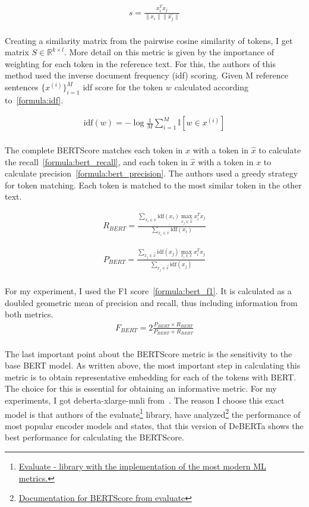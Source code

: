 \begin{align}\label{formula:cosine_sim}
    s = \frac{x_i^T x_j}{\|x_i\| \|\hat{x_j}\|}
\end{align}\\
Creating a similarity matrix from the pairwise cosine similarity of tokens, I get matrix $S \in \mathbb{R}^{k \times l}$. More detail on this metric is given by the importance of weighting for each token in the reference text. For this, the authors of this method used the inverse document frequency (idf) scoring. Given M reference sentences $\{ x^{(i)} \}_{i=1}^M$ idf score for the token $w$ calculated according to~\ref{formula:idf}. 

\begin{align}\label{formula:idf}
    \text{idf}(w) = -\log \frac{1}{M} \sum_{i=1}^{M} \mathbb{I}\left[ w \in x^{(i)} \right]
\end{align}\\
The complete BERTScore matches each token in $x$ with a token in $\hat{x}$ to calculate the recall~\ref{formula:bert_recall}, and each token in $\hat{x}$ with a token in $x$ to calculate precision~\ref{formula:bert_precision}. The authors used a greedy strategy for token matching. Each token is matched to the most similar token in the other text. 

\begin{align}\label{formula:bert_recall}
    R_{BERT} = \frac{\sum_{x_i \in x } \text{idf}(x_i) \max_{x_j \in \hat{x}} x_i^T x_j}{\sum_{x_i \in x} \text{idf}(x_i)}
\end{align}

\begin{align}\label{formula:bert_precision}
    P_{BERT} = \frac{\sum_{x_j \in \hat{x} } \text{idf}(x_j) \max_{x_i \in x} x_i^T x_j}{\sum_{x_j \in \hat{x}} \text{idf}(x_j)}
\end{align}\\
For my experiment, I used the F1 score~\ref{formula:bert_f1}. It is calculated as a doubled geometric mean of precision and recall, thus including information from both metrics. 
\begin{align}\label{formula:bert_f1}
    F_{BERT} = 2\frac{P_{BERT} \times R_{BERT}}{P_{BERT} + R_{BERT}}
\end{align}\\
The last important point about the BERTScore metric is the sensitivity to the base BERT model. As written above, the most important step in calculating this metric is to obtain representative embedding for each of the tokens with BERT\@. The choice for this is essential for obtaining an informative metric. For my experiments, I got deberta-xlarge-mnli from~\cite{he2021deberta}. The reason I choose this exact model is that authors of the evaluate\footnote[1]{\href{https://huggingface.co/docs/evaluate/index}{Evaluate - library with the implementation of the most modern ML metrics.}} library, have analyzed\footnote[2]{\href{https://huggingface.co/spaces/evaluate-metric/bertscore}{Documentation for BERTScore from evaluate}} the performance of most popular encoder models and states, that this version of DeBERTa shows the best performance for calculating the BERTScore.